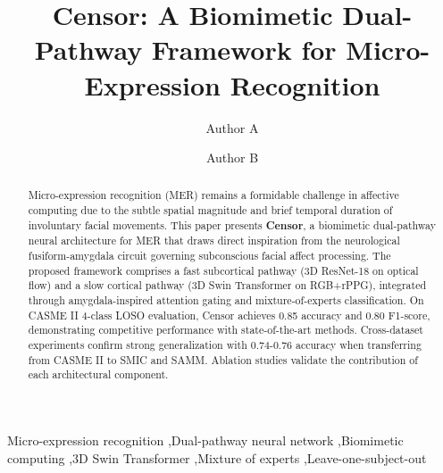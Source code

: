 \documentclass[preprint,12pt]{elsarticle}
\begin{document}
\begin{frontmatter}

\title{Censor: A Biomimetic Dual-Pathway Framework for Micro-Expression Recognition}

\author[inst1]{Author A}
\author[inst1]{Author B}


\begin{abstract}
Micro-expression recognition (MER) remains a formidable challenge in affective computing due to the subtle spatial magnitude and brief temporal duration of involuntary facial movements. This paper presents \textbf{Censor}, a biomimetic dual-pathway neural architecture for MER that draws direct inspiration from the neurological fusiform-amygdala circuit governing subconscious facial affect processing. The proposed framework comprises a fast subcortical pathway (3D ResNet-18 on optical flow) and a slow cortical pathway (3D Swin Transformer on RGB+rPPG), integrated through amygdala-inspired attention gating and mixture-of-experts classification. On CASME II 4-class LOSO evaluation, Censor achieves 0.85 accuracy and 0.80 F1-score, demonstrating competitive performance with state-of-the-art methods. Cross-dataset experiments confirm strong generalization with 0.74-0.76 accuracy when transferring from CASME II to SMIC and SAMM. Ablation studies validate the contribution of each architectural component.
\end{abstract}

\begin{keyword}
Micro-expression recognition \sep Dual-pathway neural network \sep Biomimetic computing \sep 3D Swin Transformer \sep Mixture of experts \sep Leave-one-subject-out
\end{keyword}

\end{frontmatter}

\linenumbers










\end{document}
